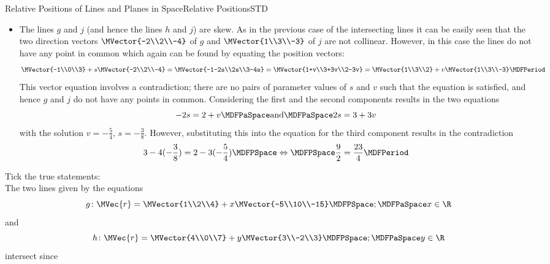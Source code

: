 \begin{MXContent}{Relative Positions of Lines and Planes in Space}{Relative Positions}{STD}
\begin{MExample}
\begin{itemize}
\item The lines $g$ and $j$ (and hence the lines $h$ and $j$) are skew. As in the previous case of the 
intersecting lines it can be easily seen that the two direction vectors $\MVector{-2\\2\\-4}$ of $g$ and $\MVector{1\\3\\-3}$ 
of $j$ are not collinear. However, in this case the lines do not have any point in common which again can be found 
by equating the position vectors:
\[
 \MVector{-1\\0\\3}+s\MVector{-2\\2\\-4}=\MVector{-1-2s\\2s\\3-4s}=\MVector{1+v\\3+3v\\2-3v}=\MVector{1\\3\\2}+v\MVector{1\\3\\-3}\MDFPeriod
\]
This vector equation involves a contradiction; there are no pairs of parameter values of $s$ and $v$
such that the equation is satisfied, and hence $g$ and $j$ do not have any points in common. Considering the 
first and the second components results in the two equations 
\[
 -2s=2+v\MDFPaSpace\textrm{and}\MDFPaSpace 2s=3+3v
\]
with the solution  $v=-\frac{5}{4}$, $s=-\frac{3}{8}$. However, substituting this into the equation for 
the third component results in the contradiction
\[
 3-4(-\frac{3}{8})=2-3(-\frac{5}{4})\MDFPSpace\Leftrightarrow\MDFPSpace \frac{9}{2}=\frac{23}{4} \MDFPeriod
\]

\end{itemize}

\end{MExample}

\begin{MExercise}
Tick the true statements: \\
The two lines given by the equations  
\[
 g\colon\MVec{r}=\MVector{1\\2\\4}+x\MVector{-5\\10\\-15}\MDFPSpace;\MDFPaSpace x\in\R
\]
and
\[
 h\colon\MVec{r}=\MVector{4\\0\\7}+y\MVector{3\\-2\\3} \MDFPSpace;\MDFPaSpace y\in\R
\]
intersect since 


\end{MExercise}
\end{MXContent}
